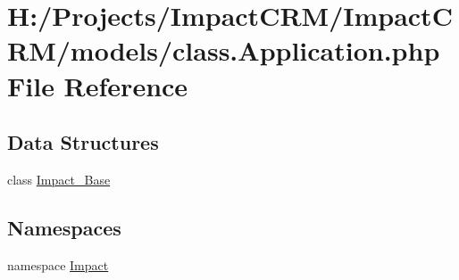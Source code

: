 \hypertarget{class_8Application_8php}{
\section{H:/Projects/ImpactCRM/ImpactCRM/models/class.Application.php File Reference}
\label{class_8Application_8php}
}
\subsection*{Data Structures}
\begin{DoxyCompactItemize}
\item 
class \hyperlink{classImpact__Base}{Impact\_\-Base}
\end{DoxyCompactItemize}
\subsection*{Namespaces}
\begin{DoxyCompactItemize}
\item 
namespace \hyperlink{namespaceImpact}{Impact}
\end{DoxyCompactItemize}
